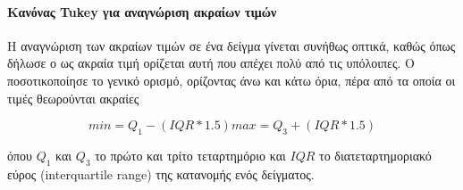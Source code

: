 \paragraph{Κανόνας Tukey για αναγνώριση ακραίων τιμών} Η αναγνώριση των ακραίων τιμών σε ένα δείγμα γίνεται συνήθως οπτικά, καθώς όπως δήλωσε ο \citet{Grubbs} ως ακραία τιμή ορίζεται αυτή που απέχει πολύ από τις υπόλοιπες. \label{eq:tukey}Ο \citet{Tukey} ποσοτικοποίησε το γενικό ορισμό, ορίζοντας άνω και κάτω όρια, πέρα από τα οποία οι τιμές θεωρούνται ακραίες

\begin{equation}
\label{eq:tukey}
min =  Q_1 - (IQR * 1.5)
max =  Q_3 + (IQR * 1.5)
\end{equation}

όπου $Q_1$ και $Q_3$ το πρώτο και τρίτο τεταρτημόριο και $IQR$ το διατεταρτημοριακό εύρος (interquartile range) της κατανομής ενός δείγματος. 
